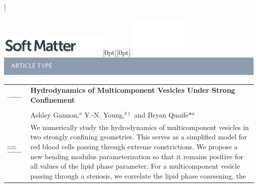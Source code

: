 \documentclass[twoside,twocolumn,9pt]{article}
\begin{document}
\twocolumn[
  \begin{@twocolumnfalse}
{\includegraphics[height=30pt]{head_foot/SM}\hfill\raisebox{0pt}[0pt][0pt]{\includegraphics[height=55pt]{head_foot/RSC_LOGO_CMYK}}\\[1ex]
\includegraphics[width=18.5cm]{head_foot/header_bar}}\par
\vspace{1em}
\sffamily
\begin{tabular}{m{4.5cm} p{13.5cm} }
%
\includegraphics{head_foot/DOI} & \noindent\LARGE{\textbf{Hydrodynamics of Multicomponent Vesicles Under Strong Confinement}} \\
\vspace{0.3cm} & \vspace{0.3cm} \\
%
 & \noindent\large{Ashley Gannon,\textit{$^{a}$} Y.-N. Young,\textit{$^{b\ddag}$} and Bryan Quaife\textit{${\ast}${$^{a}$}}} \\
%
\includegraphics{head_foot/dates} & \noindent\normalsize{We numerically
  study the hydrodynamics of multicomponent vesicles in two strongly
  confining geometries. This serves as a simplified model for red blood
  cells passing through extreme constrictions. We propose a new bending
  modulus parameterization so that it remains positive for all values of
  the lipid phase parameter. For a multicomponent vesicle passing
  through a stenosis, we correlate the lipid phase coarsening, the
}
\end{tabular}
\end{@twocolumnfalse}
\end{document}
